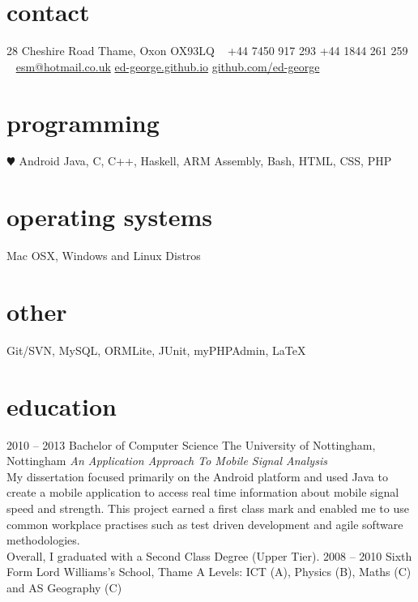\documentclass[]{friggeri-cv} %
\begin{document}


\begin{aside} %
\section{contact}
28 Cheshire Road
Thame, Oxon
OX93LQ
~
+44 7450 917 293
+44 1844 261 259
~
\href{mailto:esm@hotmail.co.uk}{esm@hotmail.co.uk}
\href{http://ed-george.github.io}{ed-george.github.io}
\href{http://github.com/ed-george}{github.com/ed-george}
\section{programming}
{\color{red} $\varheartsuit$} Android
Java, C, C++, Haskell, ARM Assembly, Bash, HTML, CSS, PHP
\section{operating systems}
Mac OSX, Windows and Linux Distros
\section{other}
Git/SVN, MySQL, ORMLite, JUnit, myPHPAdmin, \LaTeX
\end{aside}


\section{education}

\begin{entrylist}
\entry
{2010 -- 2013}
{Bachelor {\normalfont of Computer Science}}
{The University of Nottingham, Nottingham}
{\emph{An Application Approach To Mobile Signal Analysis} \\ My dissertation focused primarily on the Android platform and used Java to create a mobile application to access real time information about mobile signal speed and strength. This project earned a first class mark and enabled me to use common workplace practises such as test driven development and agile software methodologies.\\Overall, I graduated with a Second Class Degree (Upper Tier).}
\entry
{2008 -- 2010}
{Sixth Form}
{Lord Williams's School, Thame}
{A Levels: ICT (A), Physics (B), Maths (C) and AS Geography (C)}
\end{entrylist}
\end{document}
